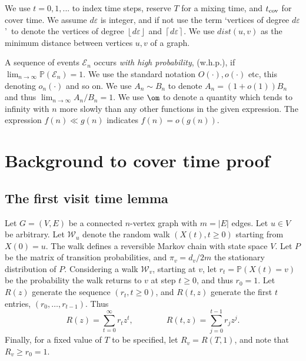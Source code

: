 \documentclass[12pt]{article}
\def\e{\varepsilon} \def\f{\phi} \def\F{{\Phi}} \def\vp{\varphi} \def\g{\gamma}
\newcommand{\ooi}{(1+o(1))}
\newcommand{\rdup}[1]{{\left\lceil #1\right\rceil }}
\newcommand{\rdown}[1]{{\left\lfloor #1\right \rfloor}}
\def\cE{{\cal E}}
\newcommand{\rai}{\rightarrow \infty}
\def\Pr{\mathbb{P}}
\def\cE{{\mathcal E}}
\def\cW{{\mathcal W}}
\def\tc{t_{\rm cov}}
\begin{document}
We use $t=0,1,...$ to index time steps,  reserve $T$ for a mixing time, and $\tc$ for cover time.
We assume $d\e$ is integer, and if not use the term \lq vertices of degree $d\e$\rq ~to denote the  vertices of degree $\rdown{d\e}$ and $\rdup{d\e}$. We use $dist(u,v)$ as the minimum distance between vertices $u,v$ of a graph.

A sequence of events $\cE_n$ occurs {\em with high probability},
(w.h.p.), if
$\lim_{n\to\infty}\Pr(\cE_n)=1$. We use the standard notation $O(\cdot), o(\cdot)$ etc, this denoting $o_n(\cdot)$ and so on.
We use $A_n \sim B_n$ to denote $A_n=\ooi B_n$ and thus $\lim_{n \rai} A_n/B_n=1$.
We use $\om$ to denote a quantity which tends to infinity with $n$ more slowly than any other functions  in the given expression.
The expression $ f(n) \ll g(n)$ indicates $f(n)=o(g(n))$.



\section{Background to cover time proof}
\subsection{The first visit time lemma}\label{fv lemma}
Let $G=(V,E)$ be a connected $n$-vertex graph with $m=|E|$ edges. Let $u\in V$ be arbitrary. Let $\cW_u$ denote the random walk $(X(t), {t \ge 0})$ starting from $X(0)=u$. The walk defines a reversible Markov chain with state space $V$. Let $P$ be the matrix of transition probabilities, and $\pi_v=d_v/2m$ the stationary distribution of $P$.
Considering a  walk $\cW_v$, starting
at $v$, let $r_t=\Pr(X(t)=v)$ be the probability  the  walk
returns to $v$ at step $t \ge 0$, and thus $r_0=1$.
Let $R(z)$ generate the sequence $(r_t, t \ge 0)$, and $R(t, z)$ generate the first $t$ entries, $(r_0,\ldots,r_{t-1})$. Thus
\[
R(z)=\sum_{t=0}^\infty r_tz^t, \qquad\qquad R(t, z)=\sum_{j=0}^{t-1} r_jz^j.
\]
Finally, for a fixed value of $T$ to be specified,  let $R_v=R(T,1)$, and note that $R_v \ge r_0=1$.
\end{document}
